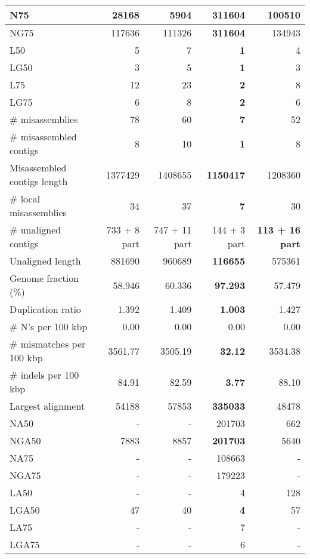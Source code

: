 \documentclass[12pt,a4paper]{article}
\begin{document}
\begin{table}[ht]
\begin{center}
\begin{tabular}{|l*{4}{|r}|}
N75 & 28168 & 5904 & {\bf 311604} & 100510 \\ \hline
NG75 & 117636 & 111326 & {\bf 311604} & 134943 \\ \hline
L50 & 5 & 7 & {\bf 1} & 4 \\ \hline
LG50 & 3 & 5 & {\bf 1} & 3 \\ \hline
L75 & 12 & 23 & {\bf 2} & 8 \\ \hline
LG75 & 6 & 8 & {\bf 2} & 6 \\ \hline
\# misassemblies & 78 & 60 & {\bf 7} & 52 \\ \hline
\# misassembled contigs & 8 & 10 & {\bf 1} & 8 \\ \hline
Misassembled contigs length & 1377429 & 1408655 & {\bf 1150417} & 1208360 \\ \hline
\# local misassemblies & 34 & 37 & {\bf 7} & 30 \\ \hline
\# unaligned contigs & 733 + 8 part & 747 + 11 part & 144 + 3 part & {\bf 113 + 16 part} \\ \hline
Unaligned length & 881690 & 960689 & {\bf 116655} & 575361 \\ \hline
Genome fraction (\%) & 58.946 & 60.336 & {\bf 97.293} & 57.479 \\ \hline
Duplication ratio & 1.392 & 1.409 & {\bf 1.003} & 1.427 \\ \hline
\# N's per 100 kbp & 0.00 & 0.00 & 0.00 & 0.00 \\ \hline
\# mismatches per 100 kbp & 3561.77 & 3505.19 & {\bf 32.12} & 3534.38 \\ \hline
\# indels per 100 kbp & 84.91 & 82.59 & {\bf 3.77} & 88.10 \\ \hline
Largest alignment & 54188 & 57853 & {\bf 335033} & 48478 \\ \hline
NA50 & - & - & 201703 & 662 \\ \hline
NGA50 & 7883 & 8857 & {\bf 201703} & 5640 \\ \hline
NA75 & - & - & 108663 & - \\ \hline
NGA75 & - & - & 179223 & - \\ \hline
LA50 & - & - & 4 & 128 \\ \hline
LGA50 & 47 & 40 & {\bf 4} & 57 \\ \hline
LA75 & - & - & 7 & - \\ \hline
LGA75 & - & - & 6 & - \\ \hline
\end{tabular}
\end{center}
\end{table}
\end{document}
